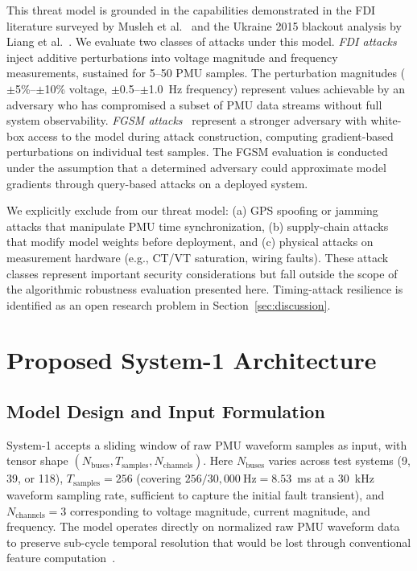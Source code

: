 \documentclass[journal]{IEEEtran}
\begin{document}
This threat model is grounded in the capabilities demonstrated in the FDI literature surveyed by Musleh et al.~\cite{ref13} and the Ukraine 2015 blackout analysis by Liang et al.~\cite{ref_liang}. We evaluate two classes of attacks under this model. \emph{FDI attacks} inject additive perturbations into voltage magnitude and frequency measurements, sustained for 5--50 PMU samples. The perturbation magnitudes ($\pm$5\%--$\pm$10\% voltage, $\pm$0.5--$\pm$1.0~Hz frequency) represent values achievable by an adversary who has compromised a subset of PMU data streams without full system observability. \emph{FGSM attacks}~\cite{ref_fgsm} represent a stronger adversary with white-box access to the model during attack construction, computing gradient-based perturbations on individual test samples. The FGSM evaluation is conducted under the assumption that a determined adversary could approximate model gradients through query-based attacks on a deployed system.

We explicitly exclude from our threat model: (a) GPS spoofing or jamming attacks that manipulate PMU time synchronization, (b) supply-chain attacks that modify model weights before deployment, and (c) physical attacks on measurement hardware (e.g., CT/VT saturation, wiring faults). These attack classes represent important security considerations but fall outside the scope of the algorithmic robustness evaluation presented here. Timing-attack resilience is identified as an open research problem in Section~\ref{sec:discussion}.

\section{Proposed System-1 Architecture}
\label{sec:architecture}

\subsection{Model Design and Input Formulation}

System-1 accepts a sliding window of raw PMU waveform samples as input, with tensor shape $(N_{\text{buses}}, T_{\text{samples}}, N_{\text{channels}})$. Here $N_{\text{buses}}$ varies across test systems (9, 39, or 118), $T_{\text{samples}} = 256$ (covering $256 / 30,000~\text{Hz} = 8.53$~ms at a 30~kHz waveform sampling rate, sufficient to capture the initial fault transient), and $N_{\text{channels}} = 3$ corresponding to voltage magnitude, current magnitude, and frequency. The model operates directly on normalized raw PMU waveform data to preserve sub-cycle temporal resolution that would be lost through conventional feature computation~\cite{ref25}.
\end{document}
